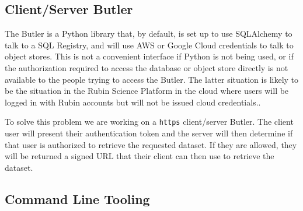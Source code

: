 \documentclass[]{spie}
\begin{document}
\subsection{Client/Server Butler}

The Butler is a Python library that, by default, is set up to use SQLAlchemy to talk to a SQL Registry, and will use AWS or Google Cloud credentials to talk to object stores.
This is not a convenient interface if Python is not being used, or if the authorization required to access the database or object store directly is not available to the people trying to access the Butler.
The latter situation is likely to be the situation in the Rubin Science Platform in the cloud where users will be logged in with Rubin accounts but will not be issued cloud credentials.\cite{DMTN-182,2021arXiv211115030O}.

To solve this problem we are working on a \texttt{https} client/server Butler\cite{DMTN-176}.
The client user will present their authentication token and the server will then determine if that user is authorized to retrieve the requested dataset.
If they are allowed, they will be returned a signed URL that their client can then use to retrieve the dataset.

\subsection{Command Line Tooling}
\end{document}
